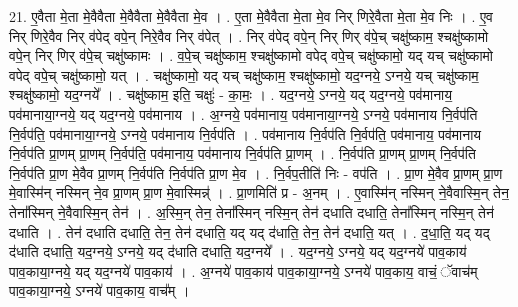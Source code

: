 \documentclass[17pt]{extarticle}
\begin{document}
21. ए॒वैता मे॒ता मे॒वैवैता मे॒वैवैता मे॒वैवैता मे॒व । . ए॒ता मे॒वैवैता मे॒ता मे॒व निर् णिरे॒वैता मे॒ता मे॒व निः । . ए॒व निर् णिरे॒वैव निर् व॑पेद् वपे॒न् निरे॒वैव निर् व॑पेत् । . निर् व॑पेद् वपे॒न् निर् णिर् व॑पे॒च् चक्षु॑ष्काम॒ श्चक्षु॑ष्कामो वपे॒न् निर् णिर् व॑पे॒च् चक्षु॑ष्कामः । . व॒पे॒च् चक्षु॑ष्काम॒ श्चक्षु॑ष्कामो वपेद् वपे॒च् चक्षु॑ष्कामो॒ यद् यच् चक्षु॑ष्कामो वपेद् वपे॒च् चक्षु॑ष्कामो॒ यत् । . चक्षु॑ष्कामो॒ यद् यच् चक्षु॑ष्काम॒ श्चक्षु॑ष्कामो॒ यद॒ग्नये॒ ऽग्नये॒ यच् चक्षु॑ष्काम॒ श्चक्षु॑ष्कामो॒ यद॒ग्नये᳚ । . चक्षु॑ष्काम॒ इति॒ चक्षुः॑ - का॒मः॒ । . यद॒ग्नये॒ ऽग्नये॒ यद् यद॒ग्नये॒ पव॑मानाय॒ पव॑मानाया॒ग्नये॒ यद् यद॒ग्नये॒ पव॑मानाय । . अ॒ग्नये॒ पव॑मानाय॒ पव॑मानाया॒ग्नये॒ ऽग्नये॒ पव॑मानाय नि॒र्वप॑ति नि॒र्वप॑ति॒ पव॑मानाया॒ग्नये॒ ऽग्नये॒ पव॑मानाय नि॒र्वप॑ति । . पव॑मानाय नि॒र्वप॑ति नि॒र्वप॑ति॒ पव॑मानाय॒ पव॑मानाय नि॒र्वप॑ति प्रा॒णम् प्रा॒णम् नि॒र्वप॑ति॒ पव॑मानाय॒ पव॑मानाय नि॒र्वप॑ति प्रा॒णम् । . नि॒र्वप॑ति प्रा॒णम् प्रा॒णम् नि॒र्वप॑ति नि॒र्वप॑ति प्रा॒ण मे॒वैव प्रा॒णम् नि॒र्वप॑ति नि॒र्वप॑ति प्रा॒ण मे॒व । . नि॒र्वप॒तीति॑ निः - वप॑ति । . प्रा॒ण मे॒वैव प्रा॒णम् प्रा॒ण मे॒वास्मि॑न् नस्मिन् ने॒व प्रा॒णम् प्रा॒ण मे॒वास्मिन्न्॑ । . प्रा॒णमिति॑ प्र - अ॒नम् । . ए॒वास्मि॑न् नस्मिन् ने॒वैवास्मि॒न् तेन॒ तेना᳚स्मिन् ने॒वैवास्मि॒न् तेन॑ । . अ॒स्मि॒न् तेन॒ तेना᳚स्मिन् नस्मि॒न् तेन॑ दधाति दधाति॒ तेना᳚स्मिन् नस्मि॒न् तेन॑ दधाति । . तेन॑ दधाति दधाति॒ तेन॒ तेन॑ दधाति॒ यद् यद् द॑धाति॒ तेन॒ तेन॑ दधाति॒ यत् । . द॒धा॒ति॒ यद् यद् द॑धाति दधाति॒ यद॒ग्नये॒ ऽग्नये॒ यद् द॑धाति दधाति॒ यद॒ग्नये᳚ । . यद॒ग्नये॒ ऽग्नये॒ यद् यद॒ग्नये॑ पाव॒काय॑ पाव॒काया॒ग्नये॒ यद् यद॒ग्नये॑ पाव॒काय॑ । . अ॒ग्नये॑ पाव॒काय॑ पाव॒काया॒ग्नये॒ ऽग्नये॑ पाव॒काय॒ वाचं॒ ॅवाच॑म् पाव॒काया॒ग्नये॒ ऽग्नये॑ पाव॒काय॒ वाच᳚म् । \newline
\end{document}
